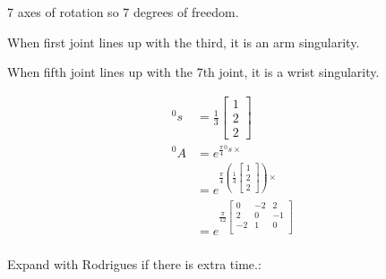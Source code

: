 \begin{solutionbox}[Q1-1]
    7  axes of rotation so 7 degrees of freedom.

    When first joint lines up with the third, it is an arm singularity.

    When fifth joint lines up with the 7th joint, it is a wrist singularity.
\end{solutionbox}


\begin{solutionbox}[Q1-2]

    \begin{align*}
        {^0s} & = \frac{1}{3}\begin{bmatrix}
                                 1 \\2\\2
                             \end{bmatrix}       \\
        {^0A} & =e^{\frac{\pi}{4} {^0s}\times}    \\
              & =e^{\frac{\pi}{4} \left(
        \frac{1}{3}\begin{bmatrix}
                       1 \\2\\2
                   \end{bmatrix}
        \right)\times}                            \\
              & =e^{\frac{\pi}{12} \begin{bmatrix}
                                       0  & -2 & 2  \\
                                       2  & 0  & -1 \\
                                       -2 & 1  & 0  \\
                                   \end{bmatrix}} \\
    \end{align*}


    Expand with Rodrigues if there is extra time.:


\end{solutionbox}
